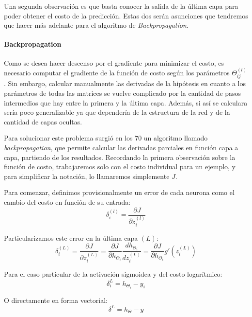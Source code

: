 Una segunda observación es que basta conocer la salida de la última capa para poder obtener el costo de la predicción. Estas dos serán asunciones que tendremos que hacer más adelante para el algoritmo de \emph{Backpropagation}.

\paragraph{Backpropagation} Como se desea hacer descenso por el gradiente para minimizar el costo, es necesario computar el gradiente de la función de costo según los parámetros $\Theta_{ij}^{(l)}$. Sin embargo, calcular manualmente las derivadas de la hipótesis en cuanto a los parámetros de todas las matrices se vuelve complicado por la cantidad de pasos intermedios que hay entre la primera y la última capa. Además, si así se calculara sería poco generalizable ya que dependería de la estructura de la red y de la cantidad de capas ocultas.

Para solucionar este problema surgió en los 70\cite{chap2} un algoritmo llamado \emph{backpropagation}, que permite calcular las derivadas parciales en función capa a capa, partiendo de los resultados. Recordando la primera observación sobre la función de costo, trabajaremos solo con el costo individual para un ejemplo, y para simplificar la notación, lo llamaremos simplemente $J$.

Para comenzar, definimos provisionalmente un error de cada neurona como el cambio del costo en función de su entrada:
\begin{equation}
\delta_i^{(l)} = \frac{\partial J}{\partial z_i^{(l)}}
\end{equation}

Particularizamos este error en la última capa $(L)$:
\begin{equation}
\delta_i^{(L)} = \frac{\partial J}{\partial z_i^{(L)}} = \frac{\partial J}{\partial h_{\Theta_i}}\frac{dh_{\Theta_i}}{dz_i^{(L)}} = \frac{\partial J}{\partial h_{\Theta_i}}g'(z_i^{(L)})
\end{equation}

Para el caso particular de la activación sigmoidea y del costo logarítmico:
\begin{equation}
\delta_i^{L} = h_{\Theta_i} - y_{i}
\end{equation}

O directamente en forma vectorial:
\begin{equation} \label{eq:errorFinal}
\delta^{L} = h_{\Theta} - y
\end{equation}

